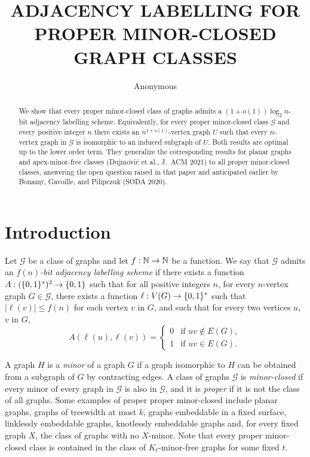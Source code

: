 \documentclass{patmorin}
\title{\MakeUppercase{\boldmath  Adjacency labelling for proper minor-closed graph classes}}
\author{
 Anonymous
 }
\date{}
\renewcommand{\leq}{\leqslant}
\newcommand{\defin}[1]{\emph{\textcolor{brightmaroon}{#1}}}
\newcommand{\calG}{\mathcal{G}}
\DeclarePairedDelimiter{\set}{\{}{\}}
\begin{document}
\maketitle

\begin{abstract}
  We show that every proper minor-closed class of graphs admits a $(1+o(1))\log_2 n$-bit adjacency labelling scheme. Equivalently, for every proper minor-closed class $\mathcal{G}$ and every positive integer $n$ there exists an $n^{1+o(1)}$-vertex graph $U$ such that every $n$-vertex graph in $\mathcal{G}$ is isomorphic to an induced subgraph of $U$.   Both results are optimal up to the lower order term. They generalize the corresponding results for planar graphs and apex-minor-free classes (Dujmovi\'c et al., J.~ACM 2021) to all proper minor-closed classes, answering the open question raised in that paper and anticipated earlier by Bonamy, Gavoille, and Pilipczuk (SODA 2020).



\end{abstract}


\bigskip
\section{Introduction}
Let $\calG$ be a class of graphs and let $f:\mathbb{N}\to\mathbb{N}$ be a function.
We say that $\calG$ admits an \defin{$f(n)$-bit adjacency labelling scheme} if there exists a function $A:(\set{0,1}^*)^2\to\set{0,1}$ such that for all positive integers $n$, for every $n$-vertex graph $G\in\calG$, there exists a function $\ell: V(G)\to\set{0,1}^*$ such that
$|\ell(v)|\leq f(n)$ for each vertex $v$ in $G$, and such that
for every two vertices $u$, $v$ in $G$,
\[
  A(\ell(u),\ell(v))=\begin{cases}
    0 & \textrm{if $uv\notin E(G)$}, \\
    1 & \textrm{if $uv\in E(G)$}.
  \end{cases}
\]


A graph $H$ is a \defin{minor} of a graph $G$ if a graph isomorphic to $H$ can
be obtained from a subgraph of $G$ by contracting edges. A class of graphs
$\mathcal{G}$ is \defin{minor-closed} if every minor of every graph in
$\mathcal{G}$ is also in $\mathcal{G}$, and it is \defin{proper} if it is not the class of all graphs. Some examples of proper proper minor-closed include planar graphs, graphs of treewidth at most $k$, graphs embeddable in a fixed
surface, linklessly embeddable graphs, knotlessly embeddable graphs and, for every fixed graph $X$, the class of graphs with no $X$-minor. Note that every proper minor-closed class is contained in the class of $K_t$-minor-free graphs for some fixed $t$.
\end{document}

